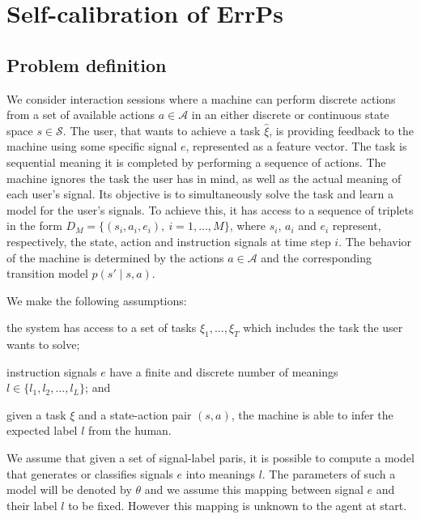 
\section{Self-calibration of ErrPs}
\label{sec:algorithm}


\subsection{Problem definition}

We consider interaction sessions where a machine can perform discrete actions from a set of available actions $a \in \mathcal{A}$ in an either discrete or continuous state space $s \in \mathcal{S}$. The user, that wants to achieve a task $\hat{\xi}$, is providing feedback to the machine using some specific signal $e$, represented as a feature vector. The task is sequential meaning it is completed by performing a sequence of actions. The machine ignores the task the user has in mind, as well as the actual meaning of each user's signal. Its objective is to simultaneously solve the task and learn a model for the user's signals. To achieve this, it has access to a sequence of triplets in the form $D_M = \{(s_i, a_i, e_i),\ i = 1,\ldots,M\}$, where $s_i$, $a_i$ and $e_i$ represent, respectively, the state, action and instruction signals at time step $i$. The behavior of the machine is determined by the actions $a\in\mathcal{A}$ and the corresponding transition model $p(s'\mid s,a)$.

We make the following assumptions: \begin{inparaenum}[a)] \item the system has access to a set of tasks $\xi_1,\ldots,\xi_T$ which includes the task the user wants to solve; \item instruction signals $e$ have a finite and discrete number of meanings $l \in \{l_1, l_2, \ldots, l_L\}$; and \item given a task $\xi$ and a state-action pair $(s,a)$, the machine is able to infer the expected label $l$ from the human. \end{inparaenum}

 We assume that given a set of signal-label paris, it is possible to compute a model that generates or classifies signals $e$ into meanings $l$. The parameters of such a model will be denoted by $\theta$ and we assume this mapping between signal $e$ and their label $l$ to be fixed. However this mapping is unknown to the agent at start.

